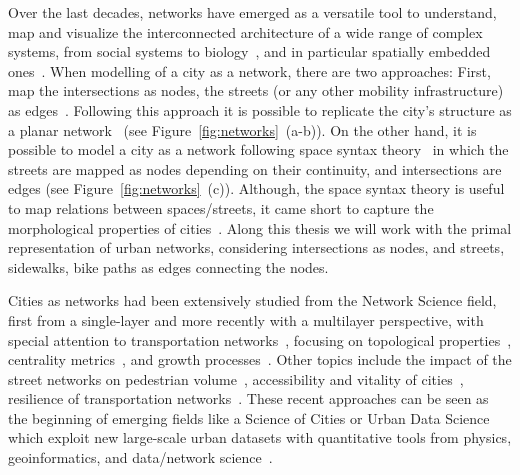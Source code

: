 Over the last decades, networks have emerged as a versatile tool to understand, map and visualize the interconnected architecture of a wide range of complex systems, from social systems to biology~\cite{albert2002statistical, dorogovtsev2002evolution, newman2003structure, boccaletti2006complex}, and in particular spatially embedded ones~\cite{barthelemy2011spatial}. When modelling of a city as a network, there are two approaches: First, map the intersections as nodes, the streets (or any other mobility infrastructure) as edges~\cite{porta2006primal}. Following this approach it is possible to replicate the city's structure as a planar network~\cite{Boeing2020Planarity} (see Figure~\ref{fig:networks}~(a-b)). On the other hand, it is possible to model a city as a network following space syntax theory~\cite{hillier1976syntax} in which the streets are mapped as nodes depending on their continuity, and intersections are edges (see Figure~\ref{fig:networks}~(c)). Although, the space syntax theory is useful to map relations between spaces/streets, it came short to capture the morphological properties of cities~\cite{batty2004new}. Along this thesis we will work with the primal representation of urban networks, considering intersections as nodes, and streets, sidewalks, bike paths as edges connecting the nodes.

Cities as networks had been extensively studied from the Network Science field, first from a single-layer and more recently with a multilayer perspective, with special attention to  transportation networks~\cite{lin2013complex,barthelemy2011spatial,ding2019application}, focusing on topological properties~\cite{jiang2004topological,cardillo2006structural,barthelemy2008patterns,batty2008size,barthelemy2011spatial,strano2013comparative,louf2014typology,boeing2020multiscale}, centrality metrics~\cite{crucitti2008centrality,Boeing2020Planarity,kirkley2018structural}, and growth processes~\cite{makse1995growth,strano2012evolution}. Other topics include the impact of the street networks on pedestrian volume~\cite{hajrasouliha2015connectivity}, accessibility and vitality of cities~\cite{denadai2016death,biazzo2019accesibility}, resilience of transportation networks~\cite{baggag2018resilience,ferretti2019resilience}. These recent approaches can be seen as the beginning of emerging fields like a Science of Cities or Urban Data Science which exploit new large-scale urban datasets with quantitative tools from physics, geoinformatics, and data/network science~\cite{batty2013new,resch2019hds}.

